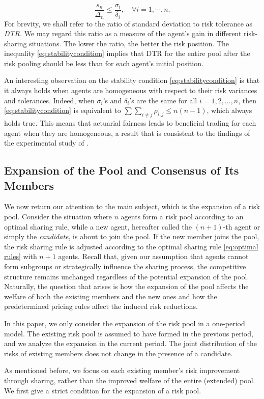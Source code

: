 \documentclass[fleqn,mnsc,nonblindrev]{informs4}
\begin{document}
\begin{equation}\label{eq:stabilitycondition}
\frac{s_n}{\Delta_n}\leq \frac{\sigma_i}{\delta_i},\quad\forall i=1, \cdots, n.
\end{equation}
For brevity,  we shall refer to the ratio of standard deviation to risk tolerance as {\it DTR.} We may regard this ratio as a measure of the agent's gain in different risk-sharing situations. The lower the ratio, the better the risk position. The inequality \eqref{eq:stabilitycondition} implies that DTR for the entire pool after the risk pooling should be less than for each agent's initial position. 
\begin{remark}\label{rem:homogenous}
An interesting observation on the stability condition \eqref{eq:stabilitycondition} is that it always holds when agents are homogeneous with respect to their risk variances and tolerances. Indeed, when $\sigma_i$'s and $\delta_i$'s are the same for all $i=1,2,...,n$, then \eqref{eq:stabilitycondition} is equivalent to 
 {$\sum\sum_{i\neq j}\rho_{i,j}\leq n(n-1)$}, which always holds true. This means that actuarial fairness leads to beneficial trading for each agent when they are homogeneous,    {a result that is consistent to the findings of the experimental study of \cite{Atta12}}.
\end{remark}

\subsection{Expansion of the Pool and Consensus of Its Members}

We now return our attention to the main subject, which is the expansion of a risk pool. Consider the situation where $n$ agents form a risk pool according to an optimal sharing rule, while a new agent, hereafter called the $(n+1)$-th agent or simply the \textit{candidate}, is about to join the pool. If the new member joins the pool, the risk sharing rule is adjusted according to the optimal sharing rule \eqref{eq:optimal rules} with $n+1$ agents.    {Recall that, given our assumption that agents cannot form subgroups or strategically influence the sharing process, the competitive structure remains unchanged regardless of the potential expansion of the pool.} Naturally, the question that arises is how the expansion of the pool affects the welfare of both the existing members and the new ones and how the predetermined pricing rules affect the induced risk reductions.

\begin{remark} 
In this paper, we only consider the expansion of the risk pool in a one-period model. The existing risk pool is assumed to have formed in the previous period, and we analyze the expansion in the current period. The joint distribution of the risks of existing members does not change in the presence of a candidate.
\end{remark}
As mentioned before, we focus on each existing member's risk improvement through sharing, rather than the improved welfare of the entire (extended) pool. We first give a strict condition for the expansion of a risk pool.
\end{document}
